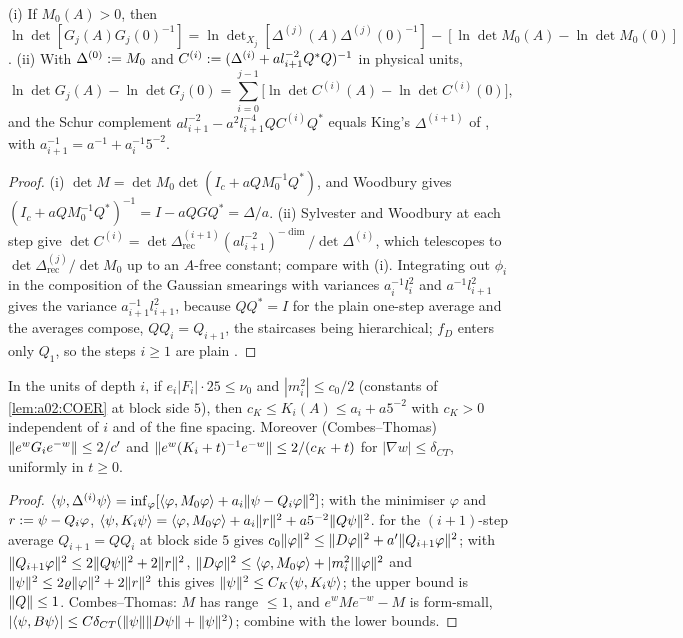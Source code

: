 \begin{lemma}\label{lem:a02:SYL}
(i) If $M_0(A)>0$, then $\ln\det[G_j(A)G_j(0)^{-1}]=\ln\det_{X_j}[\Delta^{(j)}(A)\Delta^{(j)}(0)^{-1}]-[\ln\det M_0(A)-\ln\det M_0(0)]$. (ii) With $\Delta^{(0)}:= M_0$ and $C^{(i)}:=(\Delta^{(i)}+al_{i+1}^{-2}Q^*Q)^{-1}$ in physical units,
\[
\ln\det G_j(A)-\ln\det G_j(0)=\sum_{i=0}^{j-1}\big[\ln\det C^{(i)}(A)-\ln\det C^{(i)}(0)\big],
\]
and the Schur complement $al_{i+1}^{-2}-a^2l_{i+1}^{-4}QC^{(i)}Q^*$ equals King's $\Delta^{(i+1)}$ of \cite[(2.14)]{K1}, with $a_{i+1}^{-1}=a^{-1}+a_i^{-1}5^{-2}$.
\end{lemma}
\begin{proof}
(i) $\det M=\det M_0\det(I_c+aQM_0^{-1}Q^*)$, and Woodbury gives $(I_c+aQM_0^{-1}Q^*)^{-1}=I-aQGQ^*=\Delta/a$. (ii) Sylvester and Woodbury at each step give $\det C^{(i)}=\det\Delta^{(i+1)}_{\mathrm{rec}}(al_{i+1}^{-2})^{-\dim}/\det\Delta^{(i)}$, which telescopes to $\det\Delta^{(j)}_{\mathrm{rec}}/\det M_0$ up to an $A$-free constant; compare with (i). Integrating out $\phi_i$ in the composition of the Gaussian smearings with variances $a_i^{-1}l_i^2$ and $a^{-1}l_{i+1}^2$ gives the variance $a_{i+1}^{-1}l_{i+1}^2$, because $QQ^*=I$ for the plain one-step average and the averages compose, $QQ_i=Q_{i+1}$, the staircases being hierarchical; $f_D$ enters only $Q_1$, so the steps $i\ge1$ are plain \cite[(3.2)]{K2}.
\end{proof}

\begin{lemma}\label{lem:a02:CS}
In the units of depth $i$, if $e_i|F_i|\cdot25\le\nu_0$ and $|m_i^2|\le c_0/2$ (constants of \cref{lem:a02:COER} at block side $5$), then $c_K\le K_i(A)\le a_i+a5^{-2}$ with $c_K>0$ independent of $i$ and of the fine spacing. Moreover (Combes--Thomas) $\lVert e^wG_ie^{-w}\rVert\le2/c'$ and $\lVert e^w(K_i+t)^{-1}e^{-w}\rVert\le2/(c_K+t)$ for $|\nabla w|\le\delta_{CT}$, uniformly in $t\ge0$.
\end{lemma}
\begin{proof}
$\langle \psi,\Delta^{(i)}\psi\rangle=\inf_\varphi[\langle \varphi,M_0\varphi\rangle+a_i\lVert \psi-Q_i\varphi\rVert^2]$; with the minimiser $\varphi$ and $r:=\psi-Q_i\varphi$, $\langle \psi,K_i\psi\rangle=\langle \varphi,M_0\varphi\rangle+a_i\lVert r\rVert^2+a5^{-2}\lVert Q\psi\rVert^2$.  for the $(i+1)$-step average $Q_{i+1}=QQ_i$ at block side $5$ gives $c_0\lVert \varphi\rVert^2\le\lVert D\varphi\rVert^2+a'\lVert Q_{i+1}\varphi\rVert^2$; with $\lVert Q_{i+1}\varphi\rVert^2\le2\lVert Q\psi\rVert^2+2\lVert r\rVert^2$, $\lVert D\varphi\rVert^2\le\langle \varphi,M_0\varphi\rangle+|m_i^2|\lVert \varphi\rVert^2$ and $\lVert \psi\rVert^2\le2\varrho\lVert \varphi\rVert^2+2\lVert r\rVert^2$ this gives $\lVert \psi\rVert^2\le C_K\langle \psi,K_i\psi\rangle$; the upper bound is $\lVert Q\rVert\le1$. Combes--Thomas: $M$ has range $\le1$, and $e^wMe^{-w}-M$ is form-small, $|\langle \psi,B\psi\rangle|\le C\delta_{CT}(\lVert \psi\rVert\lVert D\psi\rVert+\lVert \psi\rVert^2)$; combine with the lower bounds.
\end{proof}

